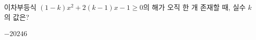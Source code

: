 \hspace*{2mm}\begin{minipage}[t]{\dimexpr\linewidth-2mm\relax}\vspace{0pt}
이차부등식 $(1-k)x^2+2(k-1)x-1\ge 0$의 해가 오직 한 개 존재할 때, 실수 $k$의 값은?
\begin{choices32}{$-2$}{$0$}{$2$}{$4$}{$6$}\end{choices32}\end{minipage}
